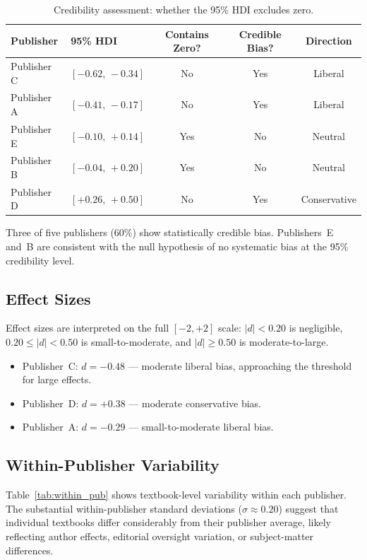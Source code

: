 \documentclass[10pt,letterpaper]{article}
\begin{document}
\begin{table}[h]
\centering
\caption{Credibility assessment: whether the 95\% HDI excludes zero.}
\label{tab:credibility}
\begin{tabular}{llccc}
\toprule
\textbf{Publisher} & \textbf{95\% HDI} & \textbf{Contains Zero?}
  & \textbf{Credible Bias?} & \textbf{Direction} \\
\midrule
Publisher C & $[-0.62,\,-0.34]$ & No  & Yes & Liberal      \\
Publisher A & $[-0.41,\,-0.17]$ & No  & Yes & Liberal      \\
Publisher E & $[-0.10,\,+0.14]$ & Yes & No  & Neutral      \\
Publisher B & $[-0.04,\,+0.20]$ & Yes & No  & Neutral      \\
Publisher D & $[+0.26,\,+0.50]$ & No  & Yes & Conservative \\
\bottomrule
\end{tabular}
\end{table}

Three of five publishers (60\%) show statistically credible bias.  Publishers~E
and~B are consistent with the null hypothesis of no systematic bias at the 95\%
credibility level.

\subsection{Effect Sizes}

Effect sizes are interpreted on the full $[-2,+2]$ scale:
$|d| < 0.20$ is negligible, $0.20 \le |d| < 0.50$ is small-to-moderate, and
$|d| \ge 0.50$ is moderate-to-large.

\begin{itemize}
  \item Publisher~C: $d = -0.48$ --- moderate liberal bias, approaching the
        threshold for large effects.
  \item Publisher~D: $d = +0.38$ --- moderate conservative bias.
  \item Publisher~A: $d = -0.29$ --- small-to-moderate liberal bias.
\end{itemize}

\subsection{Within-Publisher Variability}

Table~\ref{tab:within_pub} shows textbook-level variability within each publisher.
The substantial within-publisher standard deviations ($\sigma \approx 0.20$)
suggest that individual textbooks differ considerably from their publisher average,
likely reflecting author effects, editorial oversight variation, or subject-matter
differences.
\end{document}

